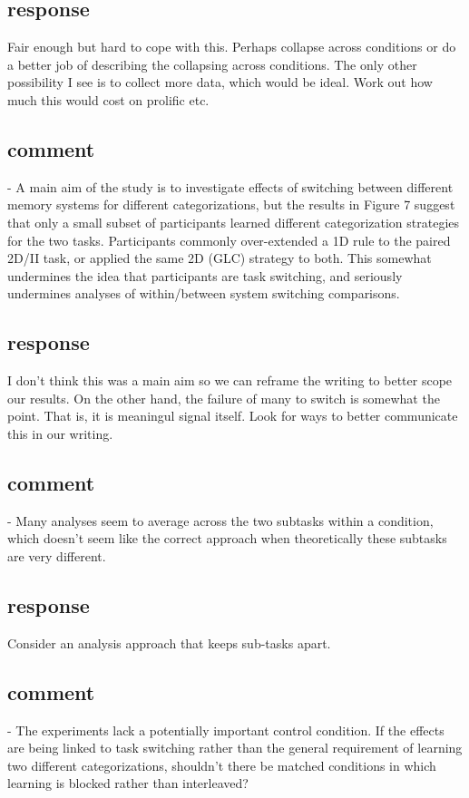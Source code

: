 \subsection{response}
Fair enough but hard to cope with this. Perhaps collapse
across conditions or do a better job of describing the
collapsing across conditions. The only other possibility I
see is to collect more data, which would be ideal. Work out
how much this would cost on prolific etc.

\subsection{comment}
- A main aim of the study is to investigate effects of
switching between different memory systems for different
categorizations, but the results in Figure 7 suggest that
only a small subset of participants learned different
categorization strategies for the two tasks. Participants
commonly over-extended a 1D rule to the paired 2D/II task,
or applied the same 2D (GLC) strategy to both. This somewhat
undermines the idea that participants are task switching,
and seriously undermines analyses of within/between system
switching comparisons.

\subsection{response}
I don't think this was a main aim so we can reframe the
writing to better scope our results. On the other hand, the
failure of many to switch is somewhat the point. That is, it
is meaningul signal itself. Look for ways to better
communicate this in our writing.

\subsection{comment}
- Many analyses seem to average across the two subtasks
within a condition, which doesn't seem like the correct
approach when theoretically these subtasks are very
different.

\subsection{response}
Consider an analysis approach that keeps sub-tasks apart.

\subsection{comment}
- The experiments lack a potentially important control
condition. If the effects are being linked to task switching
rather than the general requirement of learning two
different categorizations, shouldn't there be matched
conditions in which learning is blocked rather than
interleaved?

